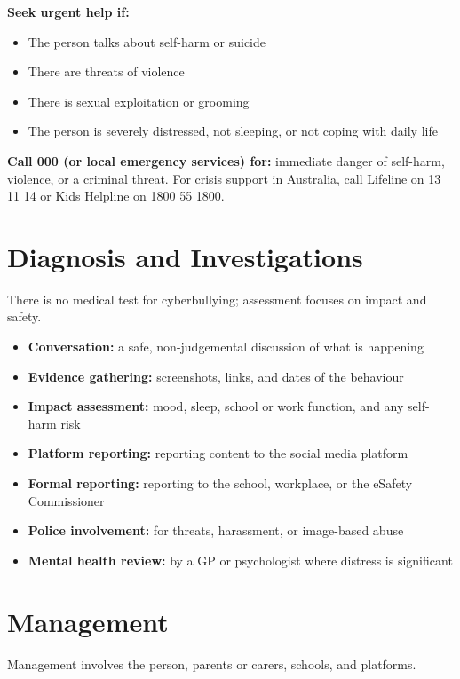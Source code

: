 \textbf{Seek urgent help if:}
\begin{itemize}
    \item The person talks about self-harm or suicide
    \item There are threats of violence
    \item There is sexual exploitation or grooming
    \item The person is severely distressed, not sleeping, or not coping with daily life
\end{itemize}

\textbf{Call 000 (or local emergency services) for:} immediate danger of self-harm, violence, or a criminal threat. For crisis support in Australia, call Lifeline on 13 11 14 or Kids Helpline on 1800 55 1800.

\section*{Diagnosis and Investigations}
There is no medical test for cyberbullying; assessment focuses on impact and safety.

\begin{itemize}
    \item \textbf{Conversation:} a safe, non-judgemental discussion of what is happening
    \item \textbf{Evidence gathering:} screenshots, links, and dates of the behaviour
    \item \textbf{Impact assessment:} mood, sleep, school or work function, and any self-harm risk
    \item \textbf{Platform reporting:} reporting content to the social media platform
    \item \textbf{Formal reporting:} reporting to the school, workplace, or the eSafety Commissioner
    \item \textbf{Police involvement:} for threats, harassment, or image-based abuse
    \item \textbf{Mental health review:} by a GP or psychologist where distress is significant
\end{itemize}

\section*{Management}
Management involves the person, parents or carers, schools, and platforms.

